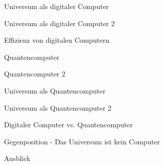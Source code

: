 \documentclass[aspectratio=1610, 9pt]{beamer}
\begin{document}
\begin{frame}{Universum als digitaler Computer}

\end{frame}

\begin{frame}{Universum als digitaler Computer 2}

\end{frame}

\begin{frame}{Effizienz von digitalen Computern}

\end{frame}

\begin{frame}{Quantencomputer}

\end{frame}

\begin{frame}{Quantencomputer 2}

\end{frame}

\begin{frame}{Universum als Quantencomputer}

\end{frame}

\begin{frame}{Universum als Quantencomputer 2}

\end{frame}

\begin{frame}{Digitaler Computer vs. Quantencomputer}

\end{frame}

\begin{frame}{Gegenposition - Das Universum ist kein Computer}

\end{frame}

\begin{frame}{Ausblick}

\end{frame}
\end{document}
